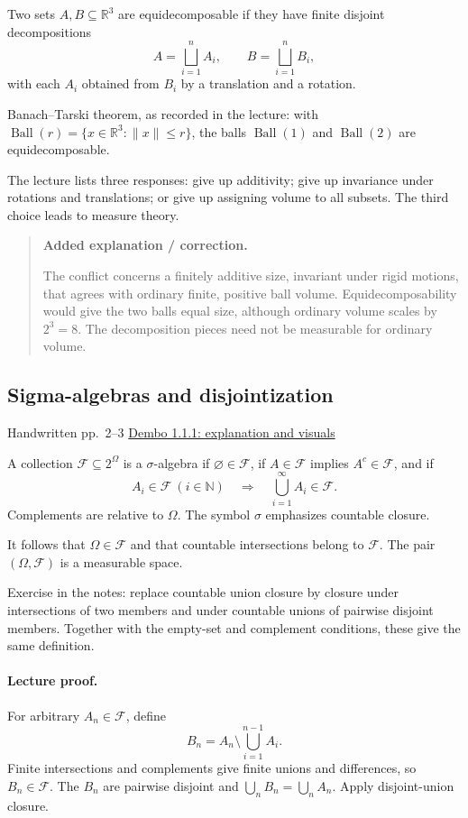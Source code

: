\documentclass[11pt,letterpaper]{article}
\newcommand{\lecturesection}[1]{\subsection{#1}}
\begin{document}
Two sets $A,B\subseteq\mathbb R^3$ are equidecomposable if they have finite disjoint decompositions \[A=\bigsqcup_{i=1}^{n}A_i,\qquad B=\bigsqcup_{i=1}^{n}B_i,\] with each $A_i$ obtained from $B_i$ by a translation and a rotation.

Banach--Tarski theorem, as recorded in the lecture: with $\operatorname{Ball}(r)=\{x\in\mathbb R^3:\lVert x\rVert\le r\}$, the balls $\operatorname{Ball}(1)$ and $\operatorname{Ball}(2)$ are equidecomposable.

The lecture lists three responses: give up additivity; give up invariance under rotations and translations; or give up assigning volume to all subsets. The third choice leads to measure theory.

\begin{quote}\small\textbf{Added explanation / correction.}

The conflict concerns a finitely additive size, invariant under rigid motions, that agrees with ordinary finite, positive ball volume. Equidecomposability would give the two balls equal size, although ordinary volume scales by $2^3=8$. The decomposition pieces need not be measurable for ordinary volume.
\end{quote}

\hypertarget{l1-s2}{}
\lecturesection{Sigma-algebras and disjointization}
{\small\textcolor{lectureink}{Handwritten pp.\ 2--3} \quad \href{https://josephrbailey.com/probability/\#entry-1-1-1}{Dembo 1.1.1: explanation and visuals}}

A collection $\mathcal F\subseteq2^\Omega$ is a $\sigma$-algebra if $\varnothing\in\mathcal F$, if $A\in\mathcal F$ implies $A^c\in\mathcal F$, and if \[A_i\in\mathcal F\ (i\in\mathbb N)\quad\Longrightarrow\quad\bigcup_{i=1}^{\infty}A_i\in\mathcal F.\] Complements are relative to $\Omega$. The symbol $\sigma$ emphasizes countable closure.

It follows that $\Omega\in\mathcal F$ and that countable intersections belong to $\mathcal F$. The pair $(\Omega,\mathcal F)$ is a measurable space.

Exercise in the notes: replace countable union closure by closure under intersections of two members and under countable unions of pairwise disjoint members. Together with the empty-set and complement conditions, these give the same definition.

\paragraph{Lecture proof.}
For arbitrary $A_n\in\mathcal F$, define \[B_n=A_n\setminus\bigcup_{i=1}^{n-1}A_i.\] Finite intersections and complements give finite unions and differences, so $B_n\in\mathcal F$. The $B_n$ are pairwise disjoint and $\bigcup_nB_n=\bigcup_nA_n$. Apply disjoint-union closure.
\end{document}
